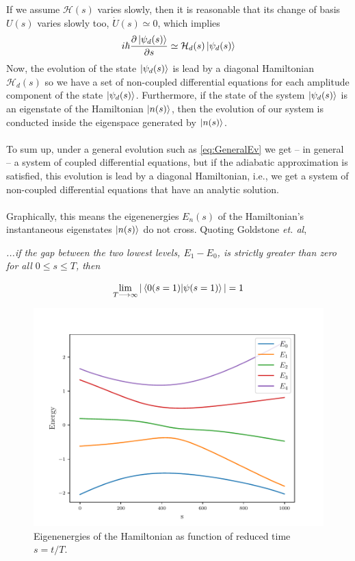 If we assume $\mathcal{H}(s)$ varies slowly, then it is reasonable that its change of basis $U(s)$ varies slowly too, $\dot{U}(s) \simeq 0$, which implies
\begin{equation}
    i\hbar  \frac{\partial \ket{\psi_{d}(s)}}{\partial s} \simeq \mathcal{H}_{d}(s)\ket{\psi_{d}(s)}
\end{equation}
Now, the evolution of the state $\ket{\psi_{d}(s)}$ is lead by a diagonal Hamiltonian $\mathcal{H}_{d}(s)$ so we have a set of non-coupled differential equations for each amplitude component of the state $\ket{\psi_{d}(s)}$. Furthermore, if the state of the system $\ket{\psi_{d}(s)}$ is an eigenstate of the Hamiltonian $\ket{n(s)}$, then the evolution of our system is conducted inside the eigenspace generated by $\ket{n(s)}$.\\\\
To sum up, under a general evolution such as \ref{eq:GeneralEv} we get -- in general -- a system of coupled differential equations, but if the adiabatic approximation is satisfied, this evolution is lead by a diagonal Hamiltonian, i.e., we get a system of non-coupled differential equations that have an analytic solution.\\\\
Graphically, this means the eigenenergies $E_{n}(s)$ of the Hamiltonian's instantaneous eigenstates $\ket{n(s)}$ do not cross.
Quoting Goldstone \textit{et. al},
\begin{displayquote}
\textit{...if the gap between the two lowest levels, $E_{1} - E_{0}$, is strictly greater than zero for all $0 \leq s \leq T$, then}
\end{displayquote}
\begin{equation}
    \lim_{T\longrightarrow \infty} | \braket{0(s=1) | \psi(s=1)}| = 1
\end{equation}
\begin{figure}[H]
    \centering
    \includegraphics[width=\textwidth]{Figures/Eigenenergies.pdf}
    \caption{Eigenenergies of the Hamiltonian as function of reduced time $s=t/T$.}
    \label{fig:Eigenenergies}
\end{figure}
